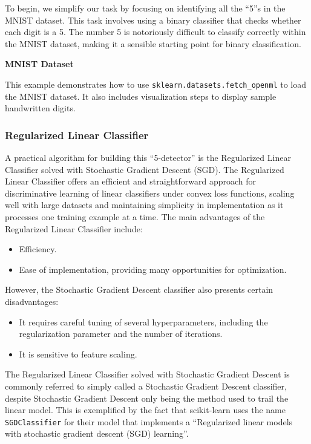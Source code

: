 \documentclass[12pt,letter]{article}
\begin{document}
\begin{data}
\end{data}


To begin, we simplify our task by focusing on identifying all the ``5''s in the MNIST dataset. This task involves using a binary classifier that checks whether each digit is a 5. The number 5 is notoriously difficult to classify correctly within the MNIST dataset, making it a sensible starting point for binary classification.


\begin{example}
\textbf{MNIST Dataset}

\noindent This example demonstrates how to use \texttt{sklearn.datasets.fetch\_openml} to load the MNIST dataset. It also includes  visualization steps to display sample handwritten digits.
\end{example}



\subsubsection{Regularized Linear Classifier}

A practical algorithm for building this ``5-detector'' is the Regularized Linear Classifier solved with Stochastic Gradient Descent (SGD). The Regularized Linear Classifier offers an efficient and straightforward approach for discriminative learning of linear classifiers under convex loss functions, scaling well with large datasets and maintaining simplicity in implementation as it processes one training example at a time. The main advantages of the Regularized Linear Classifier include:
\begin{itemize}
\item Efficiency.
\item Ease of implementation, providing many opportunities for optimization.
\end{itemize}
However, the Stochastic Gradient Descent classifier also presents certain disadvantages:
\begin{itemize}
\item It requires careful tuning of several hyperparameters, including the regularization parameter and the number of iterations.
\item It is sensitive to feature scaling.
\end{itemize}

\begin{mdframed}[middlelinewidth=0.5mm]
\begin{center}
\end{center}
The Regularized Linear Classifier solved with Stochastic Gradient Descent is commonly referred to simply called a Stochastic Gradient Descent classifier, despite Stochastic Gradient Descent only being the method used to trail the linear model. This is exemplified by the fact that scikit-learn uses the name \texttt{SGDClassifier} for their model that implements a ``Regularized linear models with stochastic gradient descent (SGD) learning''. 
\end{mdframed}
\end{document}
